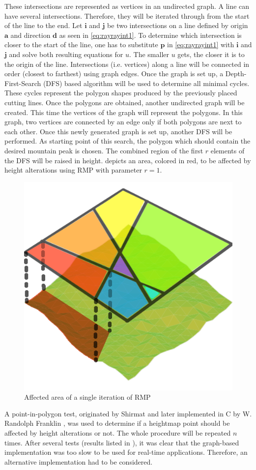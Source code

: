 \documentclass[11pt,a4paper,twoside,openright]{report}
\begin{document}
These intersections are represented as vertices in an undirected graph. A line can have several intersections. Therefore, they will be iterated through from the start of the line to the end. Let $\mathbf{i}$ and $\mathbf{j}$ be two intersections on a line defined by origin $\mathbf{a}$ and direction $\mathbf{d}$ as seen in \eqref{eq:rayrayint1}. To determine which intersection is closer to the start of the line, one has to substitute $\mathbf{p}$ in \eqref{eq:rayrayint1} with $\mathbf{i}$ and $\mathbf{j}$ and solve both resulting equations for $u$. The smaller $u$ gets, the closer it is to the origin of the line. Intersections (i.e. vertices) along a line will be connected in order (closest to farthest) using graph edges. Once the graph is set up, a Depth-First-Search (DFS) based algorithm will be used to determine all minimal cycles. These cycles represent the polygon shapes produced by the previously placed cutting lines. Once the polygons are obtained, another undirected graph will be created. This time the vertices of the graph will represent the polygons. In this graph, two vertices are connected by an edge only if both polygons are next to each other. Once this newly generated graph is set up, another DFS will be performed. As starting point of this search, the polygon which should contain the desired mountain peak is chosen. The combined region of the first $r$ elements of the DFS will be raised in height.  depicts an area, colored in red, to be affected by height alterations using RMP with parameter $r = 1$.

\begin{figure}[h]
\centering
\includegraphics[width=0.25\linewidth]{rmp_overlay1.png}
\caption{Affected area of a single iteration of RMP}\label{fig:rmpoverlay}
\end{figure}

\noindent A point-in-polygon test, originated by Shirmat \cite{Shimrat:1962:APP:368637.368653} and later implemented in C by W. Randolph Franklin \cite{Franklin:1994}, was used to determine if a heightmap point should be affected by height alterations or not. The whole procedure will be repeated $n$ times. After several tests (results listed in ), it was clear that the graph-based implementation was too slow to be used for real-time applications. Therefore, an alternative implementation had to be considered.
\end{document}
